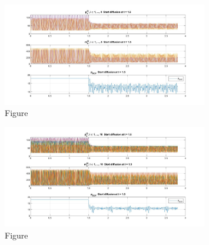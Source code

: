 \documentclass[12pt]{article}
\renewcommand{\(}{\left (}
\renewcommand{\)}{\right )}
\begin{document}
\begin{figure}[ht]
    \centering
	\begin{minipage}{0.99\textwidth}
		\centering
		\includegraphics[width=0.8\textwidth]{PF_UU_4.jpg}
		\caption*{\small Figure}
	\end{minipage}
\end{figure}


\begin{figure}[ht]
    \centering
	\begin{minipage}{0.99\textwidth}
		\centering
		\includegraphics[width=0.8\textwidth]{PF_UU_10.jpg}
		\caption*{\small Figure}
	\end{minipage}
\end{figure}

\end{document}
